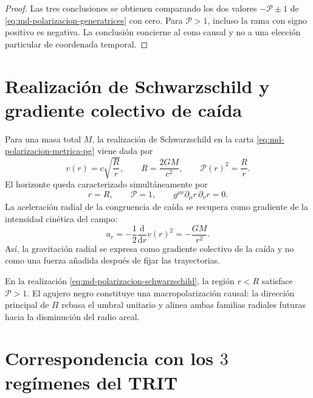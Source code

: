 \begin{proof}
Las tres conclusiones se obtienen comparando los dos valores
\(-\mathcal P\pm1\) de \eqref{eq:md-polarizacion-generatrices} con cero. Para
\(\mathcal P>1\), incluso la rama con signo positivo es negativa. La
conclusión concierne al cono causal y no a una elección particular de
coordenada temporal.
\end{proof}

\section{Realización de Schwarzschild y gradiente colectivo de caída}
\label{sec:md-polarizacion-schwarzschild}

Para una masa total \(M\), la realización de Schwarzschild en la carta
\eqref{eq:md-polarizacion-metrica-pg} viene dada por
\begin{equation}
 v(r)=c\sqrt{\frac{R}{r}},
 \qquad
 R=\frac{2GM}{c^2},
 \qquad
 \mathcal P(r)^2=\frac{R}{r}.
 \label{eq:md-polarizacion-schwarzschild}
\end{equation}
El horizonte queda caracterizado simultáneamente por
\begin{equation}
 r=R,
 \qquad
 \mathcal P=1,
 \qquad
 g^{\mu\nu}\partial_\mu r\,\partial_\nu r=0.
 \label{eq:md-polarizacion-horizonte}
\end{equation}
La aceleración radial de la congruencia de caída se recupera como gradiente
de la intensidad cinética del campo:
\begin{equation}
 a_r=-\frac12\frac{\mathrm d}{\mathrm dr}v(r)^2
 =-\frac{GM}{r^2}.
 \label{eq:md-polarizacion-gradiente}
\end{equation}
Así, la gravitación radial se expresa como gradiente colectivo de la caída y
no como una fuerza añadida después de fijar las trayectorias.

\begin{corollary}
\label{cor:md-macropolarizacion-interior}
En la realización \eqref{eq:md-polarizacion-schwarzschild}, la región
\(r<R\) satisface \(\mathcal P>1\). El agujero negro constituye una
macropolarización causal: la dirección principal de \(\Pi\) rebasa el umbral
unitario y alinea ambas familias radiales futuras hacia la disminución del
radio areal.
\end{corollary}

\section{Correspondencia con los \texorpdfstring{\(3\)}{3} regímenes del TRIT}
\label{sec:md-polarizacion-trit}

